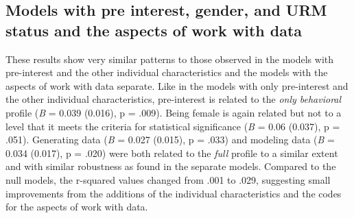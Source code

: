 \documentclass[]{msu-thesis}
\theoremstyle{definition}
\theoremstyle{definition}
\theoremstyle{definition}
\theoremstyle{remark}
\begin{document}
\begin{landscape}\begin{table}

\caption{\label{tab:reading-for-rq4}Results of mixed effects models with interest and other characteristics}
\centering
{}
\end{table}
\end{landscape}

\subsection{Models with pre interest, gender, and URM status and the
aspects of work with
data}\label{models-with-pre-interest-gender-and-urm-status-and-the-aspects-of-work-with-data}

These results show very similar patterns to those observed in the models
with pre-interest and the other individual characteristics and the
models with the aspects of work with data separate. Like in the models
with only pre-interest and the other individual characteristics,
pre-interest is related to the \emph{only behavioral} profile (\emph{B}
= 0.039 (0.016), p = .009). Being female is again related but not to a
level that it meets the criteria for statistical significance (\emph{B}
= 0.06 (0.037), p = .051). Generating data (\emph{B} = 0.027 (0.015), p
= .033) and modeling data (\emph{B} = 0.034 (0.017), p = .020) were both
related to the \emph{full} profile to a similar extent and with similar
robustness as found in the separate models. Compared to the null models,
the r-squared values changed from .001 to .029, suggesting small
improvements from the additions of the individual characteristics and
the codes for the aspects of work with data.
\end{document}
